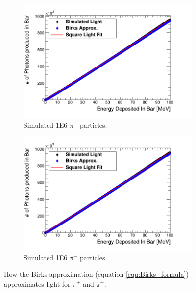 \begin{figure}[htbp]
\centering
\begin{subfigure}{.5\textwidth}
  \centering
  \includegraphics[width=\linewidth]{Appendix5/newFigs/pi+BirksSlab_simAndApproxLight.png}
  \captionsetup{width=.9\linewidth}
  \caption{Simulated 1E6 $\pi^+$ particles.}
  \label{subfig:append5_light_of_pIPlus0-100mev}
\end{subfigure}%
\begin{subfigure}{.5\textwidth}
  \centering
  \includegraphics[width=\linewidth]{Appendix5/newFigs/pi-BirksSlab_simAndApproxLight.png}
  \captionsetup{width=.9\linewidth}
  \caption{Simulated 1E6 $\pi^-$ particles.}
  \label{subfig:append5_light_of_pIMinus0-100mev}
\end{subfigure}
\caption{How the Birks approximation (equation \ref{equ:Birks_formula}) approximates light for $\pi^+$ and $\pi^-$.}
\label{fig:append5_light_of_pIPlus_pIMinus0-100mev}
\end{figure}

